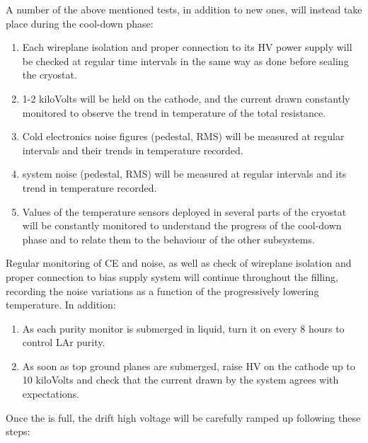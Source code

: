 A number of the above mentioned tests, in addition to new ones, will instead take place during the cool-down phase:

\begin{enumerate}


    \item Each  wireplane isolation and proper connection to its HV power supply will be checked at regular time intervals in the same way as done before sealing the cryostat.
    
    \item 1-2 kiloVolts will be held on the cathode, and the current drawn constantly monitored to observe the trend in temperature of the total resistance.
    
    \item Cold electronics noise figures (pedestal, RMS) will be measured at regular intervals and their trends in temperature recorded.
    
    \item {} system noise (pedestal, RMS) will be measured at regular intervals and its trend in temperature recorded.
    
     \item Values of the temperature sensors deployed in several parts of the cryostat will be constantly monitored to understand the progress of the cool-down phase and to relate them to the behaviour of the other  subsystems. 
     
\end{enumerate}

Regular monitoring of CE and  noise, as well as check of wireplane isolation and proper connection to bias supply system will continue throughout the filling, recording the noise variations as a function of the progressively lowering temperature. In addition:

\begin{enumerate}

    \item As each purity monitor is submerged in liquid, turn it on every 8 hours to control LAr purity.
    
    \item As soon as top ground planes are submerged, raise HV on the cathode up to 10 kiloVolts and check that the current drawn by the system agrees with expectations.

\end{enumerate}

Once the  is full, the drift high voltage will be carefully ramped up following these steps:

